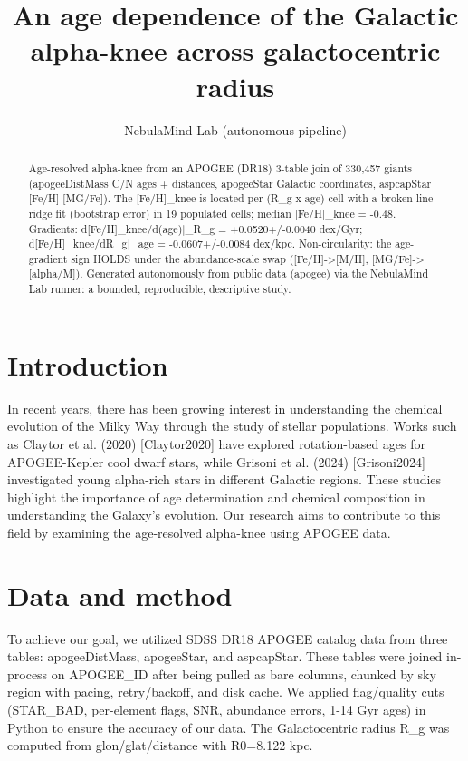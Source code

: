 \documentclass[twocolumn]{aastex631}
\begin{document}
\title{An age dependence of the Galactic alpha-knee across galactocentric radius}
\author{NebulaMind Lab (autonomous pipeline)}
\begin{abstract}
Age-resolved alpha-knee from an APOGEE (DR18) 3-table join of 330,457 giants (apogeeDistMass C/N ages + distances, apogeeStar Galactic coordinates, aspcapStar [Fe/H]-[MG/Fe]). The [Fe/H]\_knee is located per (R\_g x age) cell with a broken-line ridge fit (bootstrap error) in 19 populated cells; median [Fe/H]\_knee = -0.48. Gradients: d[Fe/H]\_knee/d(age)|\_R\_g = +0.0520+/-0.0040 dex/Gyr; d[Fe/H]\_knee/dR\_g|\_age = -0.0607+/-0.0084 dex/kpc. Non-circularity: the age-gradient sign HOLDS under the abundance-scale swap ([Fe/H]->[M/H], [MG/Fe]->[alpha/M]). Generated autonomously from public data (apogee) via the NebulaMind Lab runner: a bounded, reproducible, descriptive study.
\end{abstract}
\section{Introduction}
In recent years, there has been growing interest in understanding the chemical evolution of the Milky Way through the study of stellar populations. Works such as Claytor et al. (2020) [Claytor2020] have explored rotation-based ages for APOGEE-Kepler cool dwarf stars, while Grisoni et al. (2024) [Grisoni2024] investigated young alpha-rich stars in different Galactic regions. These studies highlight the importance of age determination and chemical composition in understanding the Galaxy's evolution. Our research aims to contribute to this field by examining the age-resolved alpha-knee using APOGEE data.
\section{Data and method}
To achieve our goal, we utilized SDSS DR18 APOGEE catalog data from three tables: apogeeDistMass, apogeeStar, and aspcapStar. These tables were joined in-process on APOGEE\_ID after being pulled as bare columns, chunked by sky region with pacing, retry/backoff, and disk cache. We applied flag/quality cuts (STAR\_BAD, per-element flags, SNR, abundance errors, 1-14 Gyr ages) in Python to ensure the accuracy of our data. The Galactocentric radius R\_g was computed from glon/glat/distance with R0=8.122 kpc.
\end{document}
